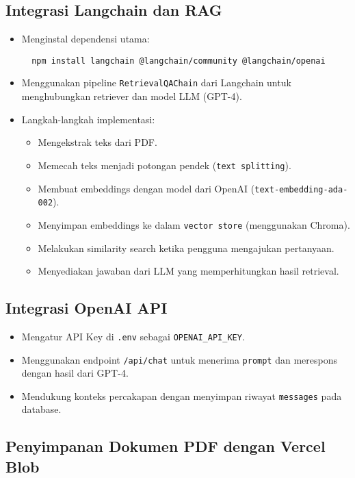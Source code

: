 \subsection{Integrasi Langchain dan RAG}

\begin{itemize}
  \item Menginstal dependensi utama:
  \begin{verbatim}
  npm install langchain @langchain/community @langchain/openai
  \end{verbatim}
  \item Menggunakan pipeline \texttt{RetrievalQAChain} dari Langchain untuk menghubungkan retriever dan model LLM (GPT-4).
  \item Langkah-langkah implementasi:
  \begin{itemize}
    \item Mengekstrak teks dari PDF.\@
    \item Memecah teks menjadi potongan pendek (\texttt{text splitting}).
    \item Membuat embeddings dengan model dari OpenAI (\texttt{text-embedding-ada-002}).
    \item Menyimpan embeddings ke dalam \texttt{vector store} (menggunakan Chroma).
    \item Melakukan similarity search ketika pengguna mengajukan pertanyaan.
    \item Menyediakan jawaban dari LLM yang memperhitungkan hasil retrieval.
  \end{itemize}
\end{itemize}

\subsection{Integrasi OpenAI API}

\begin{itemize}
  \item Mengatur API Key di \texttt{.env} sebagai \texttt{OPENAI\_API\_KEY}.
  \item Menggunakan endpoint \texttt{/api/chat} untuk menerima \texttt{prompt} dan merespons dengan hasil dari GPT-4.
  \item Mendukung konteks percakapan dengan menyimpan riwayat \texttt{messages} pada database.
\end{itemize}

\subsection{Penyimpanan Dokumen PDF dengan Vercel Blob}


